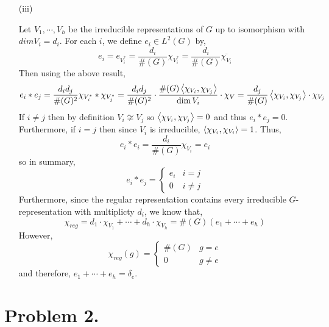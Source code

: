 \documentclass[12pt]{extarticle}
\begin{document}
\begin{enumerate}
\item[(iii)]

Let $V_1, \cdots, V_h$ be the irreducible representations of $G$ up to isomorphism with $dim{V_i} = d_i$. For each $i$, we define $e_i \in L^2(G)$ by,
\[ e_i = e_{V_i^*} = \frac{d_i}{\#(G)} \chi_{V_i^*} = \frac{d_i}{\#(G)} \overline{\chi_{V_i}} \]
Then using the above result,
\[ e_i * e_j = \frac{d_i d_j}{\#(G)^2} \chi_{V_i^*} * \chi_{V_j^*} = \frac{d_i d_j}{\#(G)^2} \cdot \frac{\#(G) \left< \chi_{V_i}, \chi_{V_j} \right>}{\dim{V_i}} \cdot \chi_V = \frac{d_j}{\#(G)} \left< \chi_{V_i}, \chi_{V_j} \right> \cdot \chi_{V_j} \]
If $i \neq j$ then by definition $V_i \not\cong V_j$ so $\left< \chi_{V_i}, \chi_{V_j} \right> = 0$ and thus $e_i * e_j = 0$. Furthermore, if $i = j$ then since $V_i$ is irreducible, $\left< \chi_{V_i}, \chi_{V_i} \right> = 1$. Thus,
\[ e_i * e_i = \frac{d_i}{\#(G)} \chi_{V_i} = e_i \]
so in summary,
\[ e_i * e_j = 
\begin{cases}
e_i & i = j \\
0 & i \neq j
\end{cases}\]
Furthermore, since the regular representation contains every irreducible $G$-representation with multiplicty $d_i$, we know that,
\[\chi_{reg} = d_1 \cdot \chi_{V_1} + \cdots + d_h \cdot \chi_{V_h} = \#(G) \left( e_1 + \cdots + e_h \right) \]
However,
\[\chi_{reg}(g) = 
\begin{cases}
\#(G) & g = e \\
0 & g \neq e 
\end{cases}\]
and therefore, $e_1 + \cdots + e_h = \delta_e$.
\end{enumerate}

\section*{Problem 2.}
\end{document}
